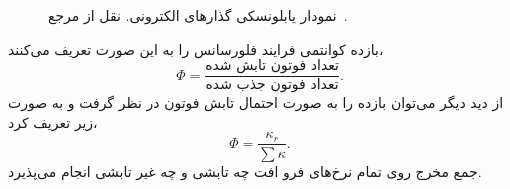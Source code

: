 \begin{figure}[tb]
	\caption{نمودار یابلونسکی گذارهای الکترونی. نقل از مرجع~\cite{albani2008principles}.}\label{fig:2}
\end{figure}

بازده کوانتمی فرایند فلورسانس را به این صورت تعریف می‌کنند،
\begin{equation}
\Phi=\frac{\text{تعداد فوتون تابش شده}}{\text{تعداد فوتون جذب شده}}.
\end{equation}
از دید دیگر می‌توان بازده را به صورت احتمال تابش فوتون در نظر گرفت و به صورت زیر تعریف کرد،
\begin{equation}
\Phi=\frac{\kappa_r}{\sum \kappa}.
\end{equation}
جمع مخرج روی تمام نرخ‌های فرو افت چه تابشی و چه غیر تابشی انجام می‌پذیرد.

%

